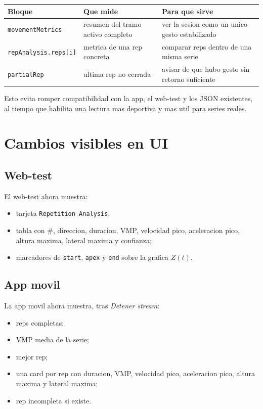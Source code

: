 \documentclass[11pt,a4paper]{article}
\begin{document}
\begin{table}[h!]
\centering
\small
\begin{tabularx}{\textwidth}{>{\raggedright\arraybackslash}p{3.2cm}X X}
\toprule
Bloque & Que mide & Para que sirve \\
\midrule
\texttt{movementMetrics} & resumen del tramo activo completo & ver la sesion como un unico gesto estabilizado \\
\texttt{repAnalysis.reps[i]} & metrica de una rep concreta & comparar reps dentro de una misma serie \\
\texttt{partialRep} & ultima rep no cerrada & avisar de que hubo gesto sin retorno suficiente \\
\bottomrule
\end{tabularx}
\end{table}

Esto evita romper compatibilidad con la app, el web-test y los JSON existentes, al tiempo que habilita una lectura mas deportiva y mas util para series reales.

\section{Cambios visibles en UI}
\subsection*{Web-test}
El web-test ahora muestra:
\begin{itemize}[leftmargin=14pt]
  \item tarjeta \texttt{Repetition Analysis};
  \item tabla con \#, direccion, duracion, VMP, velocidad pico, aceleracion pico, altura maxima, lateral maxima y confianza;
  \item marcadores de \texttt{start}, \texttt{apex} y \texttt{end} sobre la grafica \(Z(t)\).
\end{itemize}

\subsection*{App movil}
La app movil ahora muestra, tras \emph{Detener stream}:
\begin{itemize}[leftmargin=14pt]
  \item reps completas;
  \item VMP media de la serie;
  \item mejor rep;
  \item una card por rep con duracion, VMP, velocidad pico, aceleracion pico, altura maxima y lateral maxima;
  \item rep incompleta si existe.
\end{itemize}
\end{document}
